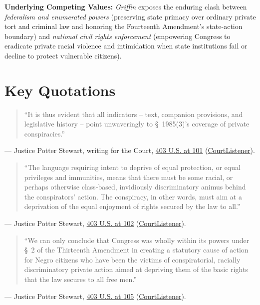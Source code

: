 \documentclass[12pt]{article}
\begin{document}
\textbf{Underlying Competing Values:} \textit{Griffin} exposes the enduring clash between \textit{federalism and enumerated powers} (preserving state primacy over ordinary private tort and criminal law and honoring the Fourteenth Amendment's state-action boundary) and \textit{national civil rights enforcement} (empowering Congress to eradicate private racial violence and intimidation when state institutions fail or decline to protect vulnerable citizens).

\section{Key Quotations}

\begin{quote}
``It is thus evident that all indicators -- text, companion provisions, and legislative history -- point unwaveringly to \S~1985(3)'s coverage of private conspiracies.''
\end{quote}
\noindent --- Justice Potter Stewart, writing for the Court, \href{https://supreme.justia.com/cases/federal/us/403/88/}{403 U.S. at 101} (\href{https://www.courtlistener.com/opinion/108362/griffin-v-breckenridge/}{CourtListener}).

\begin{quote}
``The language requiring intent to deprive of equal protection, or equal privileges and immunities, means that there must be some racial, or perhaps otherwise class-based, invidiously discriminatory animus behind the conspirators' action. The conspiracy, in other words, must aim at a deprivation of the equal enjoyment of rights secured by the law to all.''
\end{quote}
\noindent --- Justice Potter Stewart, \href{https://supreme.justia.com/cases/federal/us/403/88/}{403 U.S. at 102} (\href{https://www.courtlistener.com/opinion/108362/griffin-v-breckenridge/}{CourtListener}).

\begin{quote}
``We can only conclude that Congress was wholly within its powers under \S~2 of the Thirteenth Amendment in creating a statutory cause of action for Negro citizens who have been the victims of conspiratorial, racially discriminatory private action aimed at depriving them of the basic rights that the law secures to all free men.''
\end{quote}
\noindent --- Justice Potter Stewart, \href{https://supreme.justia.com/cases/federal/us/403/88/}{403 U.S. at 105} (\href{https://www.courtlistener.com/opinion/108362/griffin-v-breckenridge/}{CourtListener}).
\end{document}
